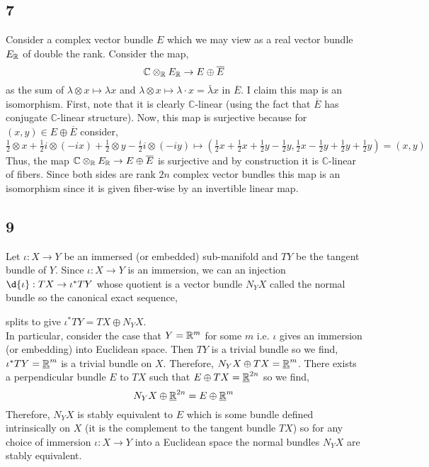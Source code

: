 \documentclass[12pt]{extarticle}
\newcommand{\C}{\mathbb{C}}
\begin{document}
\subsection{7}

Consider a complex vector bundle $E$ which we may view as a real vector bundle $E_{\mathbb{R}}$ of double the rank. Consider the map,
\[ \C \otimes_\R E_\R \to E \oplus \overline{E} \]
as the sum of $\lambda \otimes x \mapsto \lambda x$ and $\lambda \otimes x \mapsto \lambda \cdot x = \bar{\lambda} x$ in $\overline{E}$. I claim this map is an isomorphism. First, note that it is clearly $\C$-linear (using the fact that $\overline{E}$ has conjugate $\C$-linear structure). Now, this map is surjective because for $(x, y) \in E \oplus \overline{E}$ consider,
\[ \tfrac{1}{2} \otimes x + \tfrac{1}{2} i \otimes (-i x) + \tfrac{1}{2} \otimes y - \tfrac{i}{2} i \otimes (-iy) \mapsto (\tfrac{1}{2} x + \tfrac{1}{2} x + \tfrac{1}{2} y - \tfrac{1}{2} y, \tfrac{1}{2} x - \tfrac{1}{2} y + \tfrac{1}{2} y + \tfrac{1}{2} y) = (x, y) \]
Thus, the map $\C \otimes_\R E_\R \to E \oplus \overline{E}$ is surjective and by construction it is $\C$-linear of fibers. Since both sides are rank $2 n$ complex vector bundles this map is an isomorphism since it is given fiber-wise by an invertible linear map.

\subsection{9}

Let $\iota : X \to Y$ be an immersed (or embedded) sub-manifold and $T Y$ be the tangent bundle of $Y$. Since $\iota : X \to Y$ is an immersion, we can an injection $\d{\iota} : TX \to \iota^* TY$ whose quotient is a vector bundle $N_Y X$ called the normal bundle so the canonical exact sequence,
\begin{center}
\end{center}
splits to give $\iota^* TY = TX \oplus N_Y X$. 
\bigskip\\
In particular, consider the case that $Y = \mathbb{R}^m$ for some $m$ i.e. $\iota$ gives an immersion (or embedding) into Euclidean space. Then $TY$ is a trivial bundle so we find, $\iota^* T Y = \underline{\mathbb{R}}^m$ is a trivial bundle on $X$. Therefore, $N_Y X \oplus TX = \underline{\mathbb{R}}^m$. There exists a perpendicular bundle $E$ to $TX$ such that $E \oplus TX = \underline{\mathbb{R}}^{2n}$ so we find,
\[ N_Y X \oplus \underline{\mathbb{R}}^{2n} = E \oplus \underline{\mathbb{R}}^m \]
Therefore, $N_Y X$ is stably equivalent to $E$ which is some bundle defined intrinsically on $X$ (it is the complement to the tangent bundle $TX$) so for any choice of immersion $\iota : X \to Y$ into a Euclidean space the normal bundles $N_Y X$ are stably equivalent.
\end{document}
